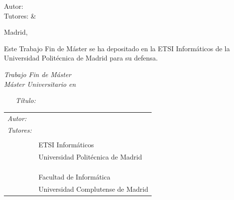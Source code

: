 \begin{titlepage}
\vspace*{0.5cm}
\begin{center}
\huge\bfseries {  \TituloTFM{} } 
\end{center}

\vspace*{5cm}

\noindent
\large{Autor: \NombreAutor{} }\\
\large{Tutores: \NombreTutorUPM{} \& \NombreTutorUCM{} }


\vspace*{4cm}
\begin{center}
Madrid, \Fecha
\end{center}

\cleardoublepage
\thispagestyle{empty}
\noindent
Este Trabajo Fin de Máster se ha depositado en la ETSI Informáticos de la Universidad Politécnica de Madrid para su defensa.

\vspace*{4cm}
\noindent
\textit{Trabajo Fin de Máster}\\
\textit{Máster Universitario en} \Master{}

\begin{enumerate}
\item[\textit{Título:}] \TituloTFM{}
\end{enumerate}
\Fecha


\vspace*{3cm}

\noindent
\begin{tabular}{ll}
\textit{Autor:} & \NombreAutor{}  \\ 
\textit{Tutores:} & \NombreTutorUPM{} \\
                & \DepartamentoUPM{} \\
                & ETSI Informáticos\\
                & Universidad Politécnica de Madrid \\
                \\
                & \NombreTutorUCM{}  \\ 
                & \DepartamentoUCM{} \\
                & Facultad de Informática \\
                & Universidad Complutense de Madrid                
\end{tabular} 

\end{titlepage}
